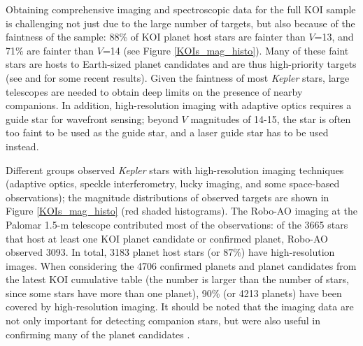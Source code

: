\documentclass[twocolumn,appendixfloats]{aastex6}
\begin{document}
Obtaining comprehensive imaging and spectroscopic data for the full KOI 
sample is challenging not just due to the large number of targets, but also 
because of the faintness of the sample: 88\% of KOI planet host stars are 
fainter than $V$=13, and 71\% are fainter than $V$=14 (see Figure 
\ref{KOIs_mag_histo}). Many of these faint stars are hosts to Earth-sized 
planet candidates and are thus high-priority targets (see \citealt{everett13} 
and \citealt{howell16} for some recent results). Given the faintness of most 
{\it Kepler} stars, large telescopes are needed to obtain deep limits on the 
presence of nearby companions. In addition, high-resolution imaging
with adaptive optics requires a guide star for wavefront sensing; beyond
$V$ magnitudes of 14-15, the star is often too faint to be used as the guide
star, and a laser guide star has to be used instead.

Different groups observed {\it Kepler} stars with high-resolution imaging techniques 
(adaptive optics, speckle interferometry, lucky imaging, and some space-based 
observations); the magnitude distributions of observed targets are shown in
Figure \ref{KOIs_mag_histo} (red shaded histograms). The Robo-AO imaging 
at the Palomar 1.5-m telescope \citep{baranec14} contributed most of the 
observations: of the 3665 
stars that host at least one KOI planet candidate or confirmed planet, Robo-AO 
observed 3093. In total, 3183 planet host stars (or 87\%) have high-resolution 
images. When considering the 4706 confirmed planets and planet candidates 
from the latest KOI cumulative table (the number is larger than the number of 
stars, since some stars have more than one planet), 90\% (or 4213 planets) 
have been covered by high-resolution imaging. 
It should be noted that the imaging data are not only important for detecting
companion stars, but were also useful in confirming many of the planet
candidates \citep[e.g.,][]{batalha11}.
\end{document}
